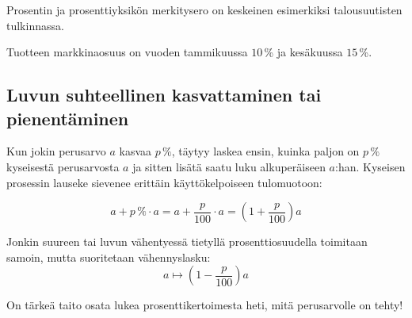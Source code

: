 Prosentin ja prosenttiyksikön merkitysero on keskeinen esimerkiksi talousuutisten tulkinnassa.

\begin{esimerkki}
    Tuotteen markkinaosuus on vuoden tammikuussa $10$\,\% ja kesäkuussa $15$\,\%.
    \begin{esimratk}
    \end{esimratk}
	\begin{esimvast}
	\end{esimvast}
\end{esimerkki}


\subsection{Luvun suhteellinen kasvattaminen tai pienentäminen}

Kun jokin perusarvo $a$ kasvaa $p\,\%$, täytyy laskea ensin, kuinka paljon on $p\,\%$ kyseisestä perusarvosta $a$ ja sitten lisätä saatu luku alkuperäiseen $a$:han. Kyseisen prosessin lauseke sievenee erittäin käyttökelpoiseen tulomuotoon:

$$a+ p\,\% \cdot a=a+ \frac{p}{100} \cdot a = (1+\frac{p}{100})a $$

Jonkin suureen tai luvun vähentyessä tietyllä prosenttiosuudella toimitaan samoin, mutta suoritetaan vähennyslasku:
$$a \mapsto (1-\frac{p}{100})a$$

On tärkeä taito osata lukea prosenttikertoimesta heti, mitä perusarvolle on tehty!


